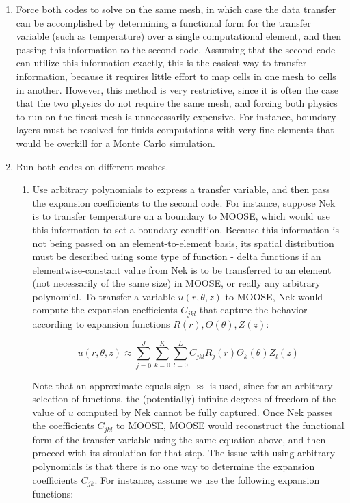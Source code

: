 \documentclass[10pt]{article}
\newcommand{\beq}{\begin{equation}}
\newcommand{\eeq}{\end{equation}}
\numberwithin{equation}{section} %
\begin{document}
\begin{enumerate}
\item Force both codes to solve on the same mesh, in which case the data transfer can be accomplished by determining a functional form for the transfer variable (such as temperature) over a single computational element, and then passing this information to the second code. Assuming that the second code can utilize this information exactly, this is the easiest way to transfer information, because it requires little effort to map cells in one mesh to cells in another. However, this method is very restrictive, since it is often the case that the two physics do not require the same mesh, and forcing both physics to run on the finest mesh is unnecessarily expensive. For instance, boundary layers must be resolved for fluids computations with very fine elements that would be overkill for a Monte Carlo simulation.
\item Run both codes on different meshes.

	\begin{enumerate}
	\item Use arbitrary polynomials to express a transfer variable, and then pass the expansion coefficients to the second code. For instance, suppose Nek is to transfer temperature on a boundary to MOOSE, which would use this information to set a boundary condition. Because this information is not being passed on an element-to-element basis, its spatial distribution must be described using some type of function - delta functions if an elementwise-constant value from Nek is to be transferred to an element (not necessarily of the same size) in MOOSE, or really any arbitrary polynomial. To transfer a variable \(u(r, \theta, z)\) to MOOSE, Nek would compute the expansion coefficients \(C_{jkl}\) that capture the behavior according to expansion functions \(R(r), \Theta(\theta), Z(z)\):
	
	\beq
	\label{eq:GenericExpansion}
	u(r, \theta, z)\approx\sum_{j=0}^J\sum_{k=0}^K\sum_{l=0}^L C_{jkl}R_j(r)\Theta_k(\theta)Z_l(z)
	\eeq
	
Note that an approximate equals sign \(\approx\) is used, since for an arbitrary selection of functions, the (potentially) infinite degrees of freedom of the value of \(u\) computed by Nek cannot be fully captured. Once Nek passes the coefficients \(C_{jkl}\) to MOOSE, MOOSE would reconstruct the functional form of the transfer variable using the same equation above, and then proceed with its simulation for that step. The issue with using arbitrary polynomials is that there is no one way to determine the expansion coefficients \(C_{jk}\). For instance, assume we use the following expansion functions:


\end{enumerate}
\end{enumerate}
\end{document}
